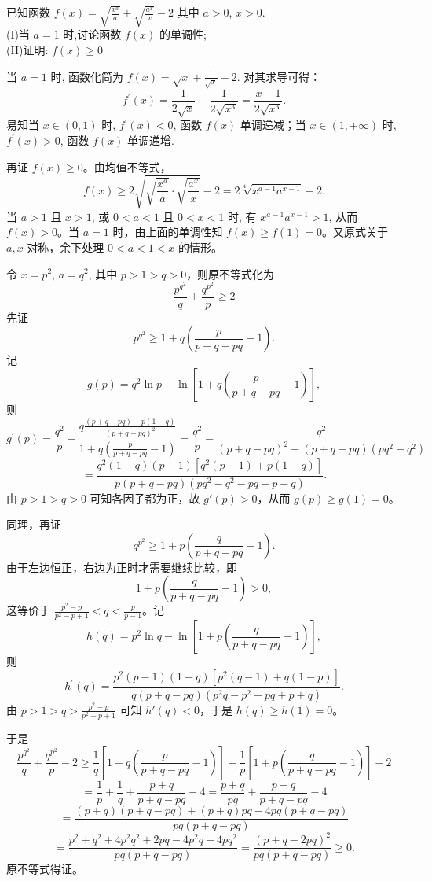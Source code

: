 \begin{example}[$f(x)=\sqrt{\frac{x^{a}}{a}}+\sqrt{\frac{a^{x}}{x}}\geq2$]
已知函数 $f(x)=\sqrt{\frac{x^{a}}{a}}+\sqrt{\frac{a^{x}}{x}}-2$ 其中 $a>0$, $x>0$. \\
(I)当 $a=1$ 时,讨论函数 $f(x)$ 的单调性;\\
(II)证明: $f(x)\ge0$
\end{example}
\begin{solution}
当 $a=1$ 时, 函数化简为 $f(x)=\sqrt{x}+\frac{1}{\sqrt{x}}-2$. 对其求导可得：
$$f^{\prime}(x)=\frac{1}{2\sqrt{x}}-\frac{1}{2\sqrt{x^{3}}}=\frac{x-1}{2\sqrt{x^{3}}}.$$
易知当 $x \in (0,1)$ 时, $f^{\prime}(x)<0$, 函数 $f(x)$ 单调递减；当 $x \in (1,+\infty)$ 时, $f^{\prime}(x)>0$, 函数 $f(x)$ 单调递增.

再证 $f(x)\ge0$。由均值不等式，
$$f(x)\ge2\sqrt{\sqrt{\frac{x^{a}}{a}}\cdot\sqrt{\frac{a^{x}}{x}}}-2=2\sqrt[4]{x^{a-1}a^{x-1}}-2.$$
当 $a>1$ 且 $x>1$, 或 $0<a<1$ 且 $0<x<1$ 时, 有 $x^{a-1}a^{x-1}>1$, 从而 $f(x)>0$。当 $a=1$ 时，由上面的单调性知 $f(x)\ge f(1)=0$。又原式关于 $a,x$ 对称，余下处理 $0<a<1<x$ 的情形。

令 $x=p^{2}$, $a=q^{2}$, 其中 $p>1>q>0$，则原不等式化为
\[\frac{p^{q^{2}}}{q}+\frac{q^{p^{2}}}{p}\ge2\]
先证
\[
p^{q^{2}}\ge1+q\left(\frac{p}{p+q-pq}-1\right).
\]
记
\[
g(p)=q^{2}\ln p-\ln\left[1+q\left(\frac{p}{p+q-pq}-1\right)\right],
\]
则
$$g^{\prime}(p)=\frac{q^{2}}{p}-\frac{q\frac{(p+q-pq)-p(1-q)}{(p+q-pq)^{2}}}{1+q\left(\frac{p}{p+q-pq}-1\right)}=\frac{q^{2}}{p}-\frac{q^{2}}{(p+q-pq)^{2}+(p+q-pq)(pq^{2}-q^{2})}$$
$$=\frac{q^{2}(1-q)(p-1)[q^{2}(p-1)+p(1-q)]}{p(p+q-pq)(pq^{2}-q^{2}-pq+p+q)}.$$
由 $p>1>q>0$ 可知各因子都为正，故 $g'(p)>0$，从而 $g(p)\ge g(1)=0$。

同理，再证
\[
q^{p^{2}}\ge1+p\left(\frac{q}{p+q-pq}-1\right).
\]
由于左边恒正，右边为正时才需要继续比较，即
\[
1+p\left(\frac{q}{p+q-pq}-1\right)>0,
\]
这等价于 $\frac{p^{2}-p}{p^{2}-p+1}<q<\frac{p}{p-1}$。记
\[
h(q)=p^{2}\ln q-\ln\left[1+p\left(\frac{q}{p+q-pq}-1\right)\right],
\]
则
$$h^{\prime}(q)=\frac{p^{2}(p-1)(1-q)[p^{2}(q-1)+q(1-p)]}{q(p+q-pq)(p^{2}q-p^{2}-pq+p+q)}.$$
由 $p>1>q>\frac{p^{2}-p}{p^{2}-p+1}$ 可知 $h'(q)<0$，于是 $h(q)\ge h(1)=0$。

于是
$$\frac{p^{q^{2}}}{q}+\frac{q^{p^{2}}}{p}-2\ge \frac{1}{q}\left[1+q\left(\frac{p}{p+q-pq}-1\right)\right] + \frac{1}{p}\left[1+p\left(\frac{q}{p+q-pq}-1\right)\right] - 2$$
$$=\frac{1}{p}+\frac{1}{q}+\frac{p+q}{p+q-pq}-4=\frac{p+q}{pq}+\frac{p+q}{p+q-pq}-4$$
$$=\frac{(p+q)(p+q-pq)+(p+q)pq-4pq(p+q-pq)}{pq(p+q-pq)}$$
$$=\frac{p^{2}+q^{2}+4p^{2}q^{2}+2pq-4p^{2}q-4pq^{2}}{pq(p+q-pq)}=\frac{(p+q-2pq)^{2}}{pq(p+q-pq)}\ge0.$$
原不等式得证。


\end{solution}
